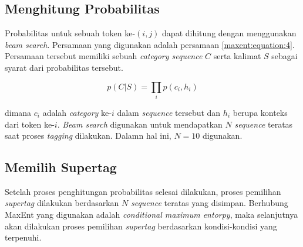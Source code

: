 \subsection{Menghitung Probabilitas}

Probabilitas untuk sebuah token ke-$(i, j)$ dapat dihitung dengan menggunakan \textit{beam search}.
Persamaan yang digunakan adalah persamaan \ref{maxent:equation:4}.
Persamaan tersebut memiliki sebuah \textit{category sequence} $C$ serta kalimat $S$ sebagai syarat
dari probabilitas tersebut.

\begin{equation}\label{maxent:equation:4}
	p(C|S) = \prod_i p(c_i, h_i)
\end{equation}

\noindent
dimana $c_i$ adalah \textit{category} ke-$i$ dalam \textit{sequence} tersebut dan $h_i$ berupa konteks
dari token ke-$i$.
\textit{Beam search} digunakan untuk mendapatkan $N$ \textit{sequence} teratas saat proses
\textit{tagging} dilakukan.
Dalamn hal ini, $N = 10$ digunakan.

\subsection{Memilih Supertag}

Setelah proses penghitungan probabilitas selesai dilakukan, proses pemilihan \textit{supertag} dilakukan
berdasarkan $N$ \textit{sequence} teratas yang disimpan.
Berhubung MaxEnt yang digunakan adalah \textit{conditional maximum entorpy}, maka selanjutnya akan
dilakukan proses pemilihan \textit{supertag} berdasarkan kondisi-kondisi yang terpenuhi.
